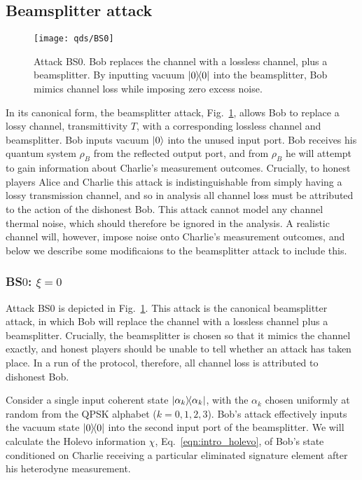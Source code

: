 \subsection{Beamsplitter attack}

\begin{figure}[htp]
\captionsetup{width=0.8\linewidth}
\centering
\texttt{[image: qds/BS0]}
\caption{\label{fig:bs0_attack} Attack BS$0$. Bob replaces the channel with a lossless channel, plus a beamsplitter. By inputting vacuum $\dyad{0}$ into the beamsplitter, Bob mimics channel loss while imposing zero excess noise.}
\end{figure}

In its canonical form, the beamsplitter attack, Fig.~\ref{fig:bs0_attack}, allows Bob to replace a lossy channel, transmittivity $T$, with a corresponding lossless channel and beamsplitter. Bob inputs vacuum $\ket{0}$ into the unused input port. Bob receives his quantum system $\rho_B$ from the reflected output port, and from $\rho_B$ he will attempt to gain information about Charlie's measurement outcomes. Crucially, to honest players Alice and Charlie this attack is indistinguishable from simply having a lossy transmission channel, and so in analysis all channel loss must be attributed to the action of the dishonest Bob.  This attack cannot model any channel thermal noise, which should therefore be ignored in the analysis. A realistic channel will, however, impose noise onto Charlie's measurement outcomes, and below we describe some modificaions to the beamsplitter attack to include this.


\subsubsection{BS$0$: $\xi = 0$}\label{sec:qds_bs0}
Attack BS$0$ is depicted in Fig.~\ref{fig:bs0_attack}. This attack is the canonical beamsplitter attack, in which Bob will replace the channel with a lossless channel plus a beamsplitter. Crucially, the beamsplitter is chosen so that it mimics the channel exactly, and honest players should be unable to tell whether an attack has taken place. In a run of the protocol, therefore, all channel loss is attributed to dishonest Bob.


Consider a single input coherent state $\dyad{\alpha_k}$, with the $\alpha_k$ chosen uniformly at random from the QPSK alphabet ($k = 0,1,2,3$). Bob's attack effectively inputs the vacuum state $\dyad{0}$ into the second input port of the beamsplitter. We will calculate the Holevo information $\chi$, Eq.~\ref{eqn:intro_holevo}, of Bob's state conditioned on Charlie receiving a particular eliminated signature element after his heterodyne measurement.

